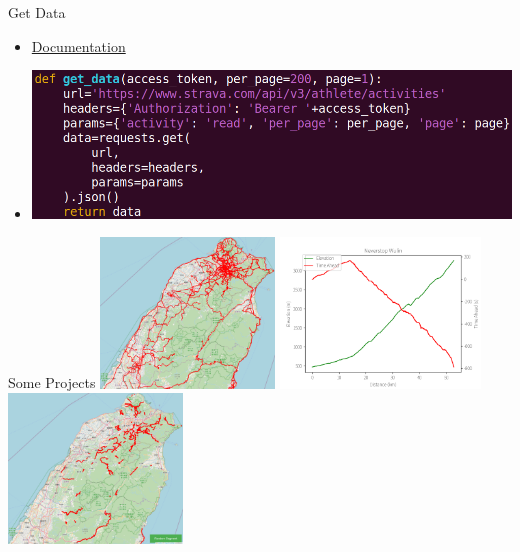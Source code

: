 \begin{frame}{Get Data}
\begin{itemize}
\item \href{https://developers.strava.com/docs/reference/}{Documentation}
\item \includegraphics[width=14cm]{getActivity.png}
\end{itemize}
\end{frame}

\begin{frame}{Some Projects}
\includegraphics[height=4cm]{apiHeatMap.png}\pause
\includegraphics[height=4cm]{NeverstopWuling.png}\pause
\includegraphics[height=4cm]{segmentHeatMap.png}
\end{frame}
